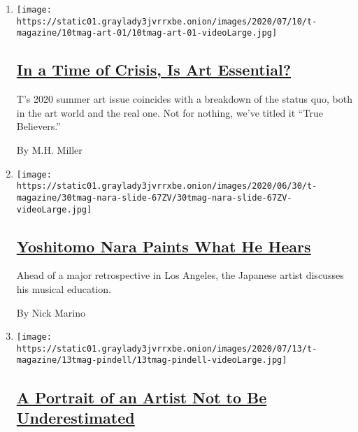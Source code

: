\begin{enumerate}
\def\labelenumi{\arabic{enumi}.}
\item
  \texttt{[image: https://static01.graylady3jvrrxbe.onion/images/2020/07/10/t-magazine/10tmag-art-01/10tmag-art-01-videoLarge.jpg]}

  \hypertarget{in-a-time-of-crisis-is-art-essential-1}{%
  \subsection{\texorpdfstring{\href{/2020/07/20/t-magazine/museums-galleries-open-art.html}{In
  a Time of Crisis, Is Art
  Essential?}}{In a Time of Crisis, Is Art Essential?}}\label{in-a-time-of-crisis-is-art-essential-1}}

  T's 2020 summer art issue coincides with a breakdown of the status
  quo, both in the art world and the real one. Not for nothing, we've
  titled it ``True Believers.''

  By M.H. Miller
\item
  \texttt{[image: https://static01.graylady3jvrrxbe.onion/images/2020/06/30/t-magazine/30tmag-nara-slide-67ZV/30tmag-nara-slide-67ZV-videoLarge.jpg]}

  \hypertarget{yoshitomo-nara-paints-what-he-hears-1}{%
  \subsection{\texorpdfstring{\href{/2020/07/24/t-magazine/yoshitomo-nara.html}{Yoshitomo
  Nara Paints What He
  Hears}}{Yoshitomo Nara Paints What He Hears}}\label{yoshitomo-nara-paints-what-he-hears-1}}

  Ahead of a major retrospective in Los Angeles, the Japanese artist
  discusses his musical education.

  By Nick Marino
\item
  \texttt{[image: https://static01.graylady3jvrrxbe.onion/images/2020/07/13/t-magazine/13tmag-pindell/13tmag-pindell-videoLarge.jpg]}

  \hypertarget{a-portrait-of-an-artist-not-to-be-underestimated-1}{%
  \subsection{\texorpdfstring{\href{/2020/07/24/t-magazine/howardena-pindell.html}{A
  Portrait of an Artist Not to Be
  Underestimated}}{A Portrait of an Artist Not to Be Underestimated}}\label{a-portrait-of-an-artist-not-to-be-underestimated-1}}


\end{enumerate}
